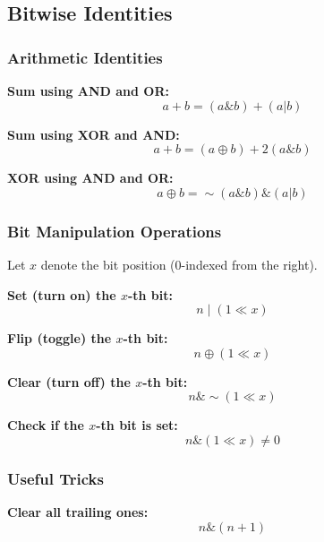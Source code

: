 \subsection{Bitwise Identities}

\subsubsection{Arithmetic Identities}

\textbf{Sum using AND and OR:}
\begin{equation}
    a + b = (a \& b) + (a | b)
\end{equation}

\textbf{Sum using XOR and AND:}
\begin{equation}
    a + b = (a \oplus b) + 2(a \& b)
\end{equation}

\textbf{XOR using AND and OR:}
\begin{equation}
    a \oplus b = \sim(a \& b) \& (a | b)
\end{equation}

\subsubsection{Bit Manipulation Operations}

Let $x$ denote the bit position (0-indexed from the right).

\textbf{Set (turn on) the $x$-th bit:}
\begin{equation}
    n \mid (1 \ll x)
\end{equation}

\textbf{Flip (toggle) the $x$-th bit:}
\begin{equation}
    n \oplus (1 \ll x)
\end{equation}

\textbf{Clear (turn off) the $x$-th bit:}
\begin{equation}
    n \& \sim(1 \ll x)
\end{equation}

\textbf{Check if the $x$-th bit is set:}
\begin{equation}
    n \& (1 \ll x) \neq 0
\end{equation}

\subsubsection{Useful Tricks}

\textbf{Clear all trailing ones:}
\begin{equation}
    n \& (n + 1)
\end{equation}

